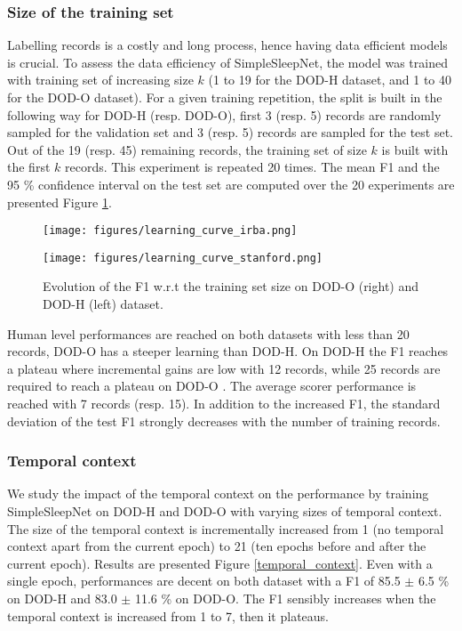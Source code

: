 \documentclass[journal]{IEEEtran}
\begin{document}
\subsubsection{Size of the training set}
Labelling records is a costly and long process, hence having data efficient models is crucial. To assess the data efficiency of SimpleSleepNet, the model was trained with training set of increasing size $k$ (1 to 19 for the DOD-H dataset, and 1 to 40 for the DOD-O dataset). For a given training repetition, the split is built in the following way for DOD-H (resp. DOD-O), first 3 (resp. 5) records are randomly sampled for the validation set and 3 (resp. 5) records are sampled for the test set. Out of the 19 (resp. 45) remaining records, the training set of size $k$ is built with the first $k$ records. This experiment is repeated 20 times. The mean F1 and the 95 \% confidence interval on the test set are computed over the 20 experiments are presented Figure \ref{learning_curve_irba}.
\begin{figure}
\vspace{-2em}
    \begin{minipage}{.48\linewidth}
    \texttt{[image: figures/learning\_curve\_irba.png]} 
    \end{minipage}
    \begin{minipage}{0.48\linewidth}
    \texttt{[image: figures/learning\_curve\_stanford.png]} 
    \label{learning_curve_stanford}
    \end{minipage}
    \caption{Evolution of the F1 w.r.t the training set size on DOD-O (right) and DOD-H (left) dataset.}
    \label{learning_curve_irba}

\end{figure}
Human level performances are reached on both datasets with less than 20 records, DOD-O has a steeper learning than DOD-H. On DOD-H  the F1 reaches a plateau where incremental gains are low with 12 records, while 25 records are required to reach a plateau on DOD-O . The average scorer performance is reached with 7 records (resp. 15). In addition to the increased F1, the standard deviation of the test F1 strongly decreases with the number of training records. 

\subsubsection{Temporal context}

We study the impact of the temporal context on the performance by training SimpleSleepNet on DOD-H and DOD-O with varying sizes of temporal context. The size of the temporal context is incrementally increased from 1 (no temporal context apart from the current epoch) to 21 (ten epochs before and after the current epoch). Results are presented Figure \ref{temporal_context}. Even with a single epoch, performances are decent on both dataset with a F1 of 85.5 $\pm$ 6.5 \% on DOD-H and 83.0 $\pm$ 11.6 \% on DOD-O. The F1 sensibly increases when the temporal context is increased from 1 to 7, then it plateaus.
\end{document}
